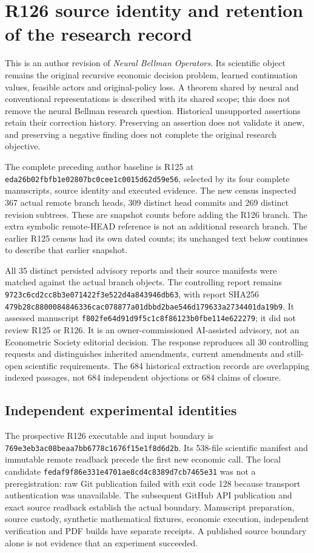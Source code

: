\section{R126 source identity and retention of the research record}
\label{dev:provenance126}

This is an author revision of \emph{Neural Bellman Operators}. Its scientific
object remains the original recursive economic decision problem, learned
continuation values, feasible actors and original-policy loss. A theorem shared
by neural and conventional representations is described with its shared scope;
this does not remove the neural Bellman research question. Historical unsupported
assertions retain their correction history. Preserving an assertion does not
validate it anew, and preserving a negative finding does not complete the
original research objective.

The complete preceding author baseline is R125 at
\nolinkurl{eda26b02fbfb1e02807bc0cee1c0015d62d59e56}, selected by its four complete
manuscripts, source identity and executed evidence. The new census inspected
367 actual remote branch heads, 309 distinct head commits and 269 distinct
revision subtrees. These are snapshot counts before adding the R126 branch.
The extra symbolic remote-HEAD reference is not an additional research branch.
The earlier R125 census had its own dated counts; its unchanged text below
continues to describe that earlier snapshot.

All 35 distinct persisted advisory reports and their source manifests were
matched against the actual branch objects. The controlling report remains
\nolinkurl{9723c6cd2cc8b3e071422f3e522d4a843946db63}, with report SHA256
\nolinkurl{479b28c8800084846336cac078877a01dbbd2bae546d179633a2734401da19b9}.
It assessed manuscript
\nolinkurl{f802fe64d91d9f5c1c8f86123b0fbe114e622279}; it did not review R125 or
R126. It is an owner-commissioned AI-assisted advisory, not an Econometric
Society editorial decision. The response reproduces all 30 controlling requests
and distinguishes inherited amendments, current amendments and still-open
scientific requirements. The 684 historical extraction records are overlapping
indexed passages, not 684 independent objections or 684 claims of closure.

\subsection{Independent experimental identities}

The prospective R126 executable and input boundary is
\nolinkurl{769e3eb3ac08beaa7bb6778c1676f15e1f8d6d2b}. Its 538-file scientific
manifest and immutable remote readback precede the first new economic call.
The local candidate \nolinkurl{fedaf9f86e331e4701ae8cd4c8389d7cb7465e31} was
not a preregistration: raw Git publication failed with exit code 128 because
transport authentication was unavailable. The subsequent GitHub API publication
and exact source readback establish the actual boundary. Manuscript preparation,
source custody, synthetic mathematical fixtures, economic execution, independent
verification and PDF builds have separate receipts. A published source boundary
alone is not evidence that an experiment succeeded.

